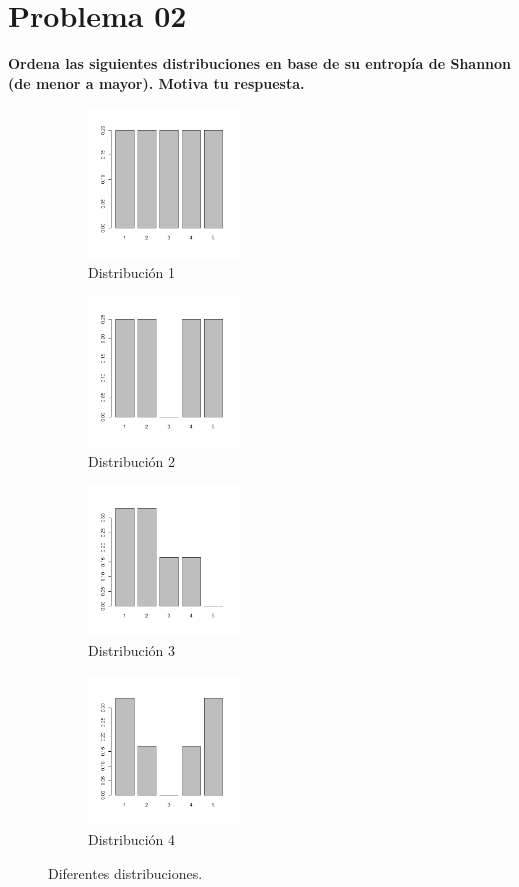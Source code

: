 
\section*{Problema 02}

\textbf{Ordena las siguientes distribuciones en base de su entropía de Shannon (de menor a mayor). Motiva tu respuesta.}

\begin{figure}[H]
    \centering
    \begin{subfigure}{4cm}
        \includegraphics[width=4cm]{Graphics/Problema_02_1.png}
        \caption{Distribución 1}
    \end{subfigure}
    \begin{subfigure}{4cm}
        \includegraphics[width=4cm]{Graphics/Problema_02_2.png}
        \caption{Distribución 2}
    \end{subfigure}
    \begin{subfigure}{4cm}
        \includegraphics[width=4cm]{Graphics/Problema_02_3.png}
        \caption{Distribución 3}
    \end{subfigure}
    \begin{subfigure}{4cm}
        \includegraphics[width=4cm]{Graphics/Problema_02_4.png}
        \caption{Distribución 4}
    \end{subfigure}
    \caption{Diferentes distribuciones.}
    \label{fig:problema_02}
\end{figure}

